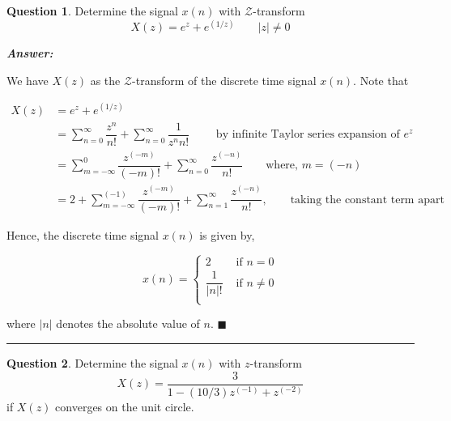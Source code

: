 \documentclass[12pt]{article}
\theoremstyle{definition}
\newtheorem{question}{Question}
\newenvironment{answer}{
    \textbf{\textit{Answer:}} \qquad
}{\hfill $\blacksquare$ \\ 

\begin{center}
    \rule{0.8\linewidth}{1.5px} 
    \vspace*{1cm}   
\end{center}
}
\newcommand{\zcal}{\mathcal{Z}}
\newcommand{\inv}[1][1]{^{(- #1)}}
\begin{document}
\begin{question}
    Determine the signal $x(n)$ with $\zcal$-transform 
    $$
    X(z) = e^z + e^{(1/z)} \qquad \vert z \vert \neq 0
    $$
\end{question}

\begin{answer}
    We have $X(z)$ as the $\zcal$-transform of the discrete time signal $x(n)$. Note that

    \begin{align*}
        X(z)
        & = e^z + e^{(1 / z)}\\
        & = \sum_{n = 0}^{\infty} \dfrac{z^n}{n!} + \sum_{n = 0}^{\infty} \dfrac{1}{z^n n!} \qquad \text{ by infinite Taylor series expansion of } e^z\\
        & = \sum_{m = -\infty}^{0} \dfrac{z\inv[m]}{(-m)!} + \sum_{n = 0}^{\infty} \dfrac{z\inv[n]}{n!} \qquad \text{where, } m = (-n)\\
        & = 2 + \sum_{m = -\infty}^{(-1)} \dfrac{z\inv[m]}{(-m)!} + \sum_{n = 1}^{\infty} \dfrac{z\inv[n]}{n!}, \qquad \text{taking the constant term apart}
    \end{align*}

    Hence, the discrete time signal $x(n)$ is given by,

    $$
    x(n) = \begin{cases}
        2 & \text{ if } n = 0\\
        \dfrac{1}{\vert n \vert !} & \text{ if } n \neq 0\\
    \end{cases}
    $$

    where $\vert n \vert$ denotes the absolute value of $n$.
\end{answer}


\begin{question}
    Determine the signal $x(n)$ with $z$-transform
    $$
    X(z) = \dfrac{3}{1 - (10/3)z^{(-1)} + z^{(-2)}}
    $$
    if $X(z)$ converges on the unit circle.
\end{question}
\end{document}

